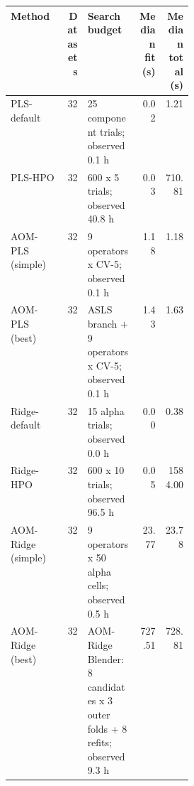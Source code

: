\begin{tabularx}{\linewidth}{p{0.30\linewidth}rXrr}
\toprule
Method & Datasets & Search budget & Median fit (s) & Median total (s) \\
\midrule
PLS-\allowbreak{}default & 32 & 25 component trials; observed 0.1 h & 0.02 & 1.21 \\
PLS-\allowbreak{}HPO & 32 & 600 x 5 trials; observed 40.8 h & 0.03 & 710.81 \\
AOM-\allowbreak{}PLS (simple) & 32 & 9 operators x CV-\allowbreak{}5; observed 0.1 h & 1.18 & 1.18 \\
AOM-\allowbreak{}PLS (best) & 32 & ASLS branch + 9 operators x CV-\allowbreak{}5; observed 0.1 h & 1.43 & 1.63 \\
Ridge-\allowbreak{}default & 32 & 15 alpha trials; observed 0.0 h & 0.00 & 0.38 \\
Ridge-\allowbreak{}HPO & 32 & 600 x 10 trials; observed 96.5 h & 0.05 & 1584.00 \\
AOM-\allowbreak{}Ridge (simple) & 32 & 9 operators x 50 alpha cells; observed 0.5 h & 23.77 & 23.78 \\
AOM-\allowbreak{}Ridge (best) & 32 & AOM-\allowbreak{}Ridge Blender: 8 candidates x 3 outer folds + 8 refits; observed 9.3 h & 727.51 & 728.81 \\
\bottomrule
\end{tabularx}
